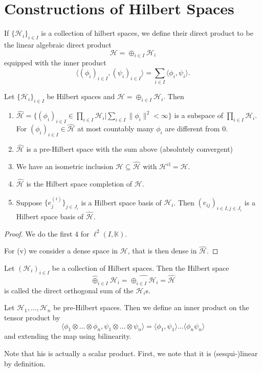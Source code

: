 \documentclass[twoside,symmetric, openany, 12pt]{./tuftebook}
\theoremstyle{definition}
\theoremstyle{definition}
\theoremstyle{definition}
\newenvironment{parts}{\begin{enumerate}[label=(\alph*)]}{\end{enumerate}}
\begin{document}
\section{Constructions of Hilbert Spaces}
\begin{Definition}
	If $\{\mathcal{H}_i\}_{i\in I}$ is a collection of hilbert spaces, we define their direct product to be the linear algebraic direct product
	\[
		\mathcal{H}=\oplus_{i\in I}\mathcal{H}_i
	\]
	equipped with the inner product
	\[
		\langle (\phi_i)_{i\in I}, (\psi_i)_{i\in I}\rangle = \sum_{i\in I} \langle \phi_i, \psi_i\rangle
	.\] 
\end{Definition}

\begin{Proposition}
	Let $\{\mathcal{H}_i\}_{i\in I}$ be Hilbert spaces and $\mathcal{H}=\oplus_{i\in I}\mathcal{H}_i$. Then
	\begin{parts}
	\item $\hat{\mathcal{H}}=\{(\phi_i)_{i\in I}\in \prod_{i\in I}\mathcal{H}_i|\sum_{i\in I}\|\phi_i\|^2<\infty\} $ is a subspace of $\prod_{i\in I}\mathcal{H}_i$. For $(\phi_i)_{i\in I}\in \hat{\mathcal{H}}$ at most countably many $\phi_i$ are different from 0.
	\item $\hat{\mathcal{H}}$ is a pre-Hilbert space with the sum above (absolutely convergent)
	\item We have an isometric inclusion $\mathcal{H}\subseteq \hat{\mathcal{H}}$ with $\mathcal{H}^\text{cl}=\hat{\mathcal{H}}$. 
	\item $\hat{\mathcal{H}}$ is the Hilbert space completion of $\mathcal{H}$.
	\item Suppose $\{e^{(i)}_j\}_{j\in J_i}$ is a Hilbert space basis of $\mathcal{H}_i$. Then $(e_{ij})_{i\in I,j\in J_i}$ is a Hilbert space basis of $\hat{\mathcal{H}}$. 
	\end{parts}
\end{Proposition}
\begin{proof}
	We do the first 4 for $\ell^2(I, \mathbb{K})$.

	For (v) we consider a dense space in $\mathcal{H}$, that is then dense in $\hat{\mathcal{H}}.$
\end{proof}
\begin{Definition}
	Let $(\mathcal{H}_i)_{i\in I}$ be a collection of Hilbert spaces. Then the Hilbert space
	\[
		\hat{\oplus}_{i\in I}\mathcal{H}_i = \hat{\oplus_{i\in I} \mathcal{H}_i}= \hat{\mathcal{H}}
	\]
	is called the direct orthogonal sum of the $\mathcal{H}_i$s.
\end{Definition}
\begin{Definition}
	Let $\mathcal{H}_1, \dots, \mathcal{H}_n$ be pre-Hilbert spaces. Then we define an inner product on the tensor product by
	\[
	\langle \phi_1\otimes \dots \otimes \phi_n, \psi_1\otimes\dots \otimes \psi_n\rangle = \langle \phi_1, \psi_1\rangle \dots \langle \phi_n \psi_n\rangle
	\] 
	and extending the map using bilinearity.
\end{Definition}
Note that his is actually a scalar product. First, we note that it is (sesqui-)linear by definition. 
\end{document}
